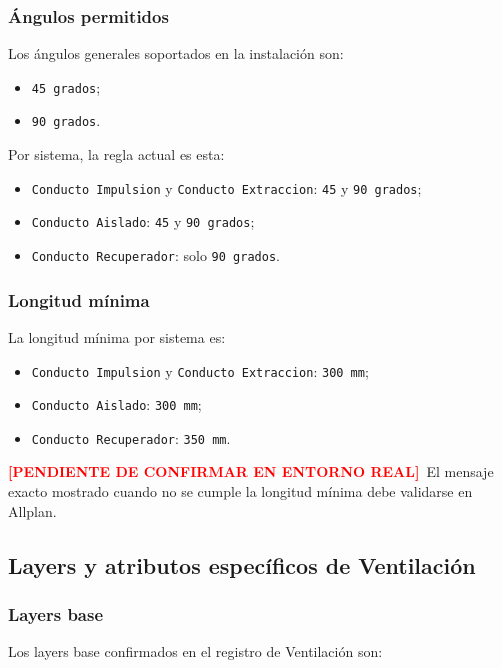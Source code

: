 \documentclass[12pt,a4paper]{article}
\newcommand{\pendingtag}{\textcolor{red}{\textbf{[PENDIENTE DE CONFIRMAR EN ENTORNO REAL]}}}
\begin{document}
\subsubsection{Ángulos permitidos}

Los ángulos generales soportados en la instalación son:

\begin{itemize}
\item \texttt{45 grados};
\item \texttt{90 grados}.
\end{itemize}

Por sistema, la regla actual es esta:

\begin{itemize}
\item \texttt{Conducto Impulsion} y \texttt{Conducto Extraccion}: \texttt{45} y \texttt{90 grados};
\item \texttt{Conducto Aislado}: \texttt{45} y \texttt{90 grados};
\item \texttt{Conducto Recuperador}: solo \texttt{90 grados}.
\end{itemize}

\subsubsection{Longitud mínima}

La longitud mínima por sistema es:

\begin{itemize}
\item \texttt{Conducto Impulsion} y \texttt{Conducto Extraccion}: \texttt{300 mm};
\item \texttt{Conducto Aislado}: \texttt{300 mm};
\item \texttt{Conducto Recuperador}: \texttt{350 mm}.
\end{itemize}

\pendingtag\ El mensaje exacto mostrado cuando no se cumple la longitud mínima debe validarse en Allplan.

\subsection{Layers y atributos específicos de Ventilación}

\subsubsection{Layers base}

Los layers base confirmados en el registro de Ventilación son:
\end{document}
